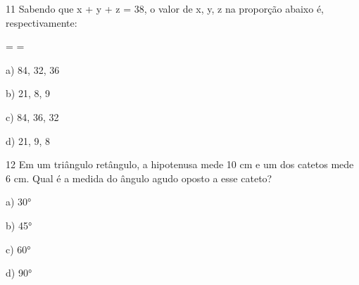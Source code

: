 \num{11} Sabendo que x + y + z = 38, o valor de x, y, z na proporção
abaixo é, respectivamente:

 =  = 

a) 84, 32, 36

b) 21, 8, 9

c) 84, 36, 32

d) 21, 9, 8



\num{12} Em um triângulo retângulo, a hipotenusa mede 10 cm e um dos catetos
mede 6 cm. Qual é a medida do ângulo agudo oposto a esse cateto?

a) 30°

b) 45°

c) 60°

d) 90°



